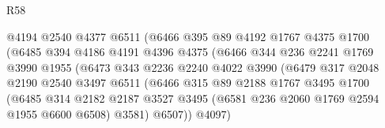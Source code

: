\begin{lexlean}{R58}
\begin{coremodule}
                                  @4194
                                  @2540
                                  @4377
                                  @6511
                                  (@6466
                                    @395
                                    @89
                                    @4192
                                    @1767
                                    @4375
                                    @1700
                                    (@6485
                                      @394
                                      @4186
                                      @4191
                                      @4396
                                      @4375
                                      (@6466
                                        @344
                                        @236
                                        @2241
                                        @1769
                                        @3990
                                        @1955
                                        (@6473
                                          @343
                                          @2236
                                          @2240
                                          @4022
                                          @3990
                                          (@6479
                                            @317
                                            @2048
                                            @2190
                                            @2540
                                            @3497
                                            @6511
                                            (@6466
                                              @315
                                              @89
                                              @2188
                                              @1767
                                              @3495
                                              @1700
                                              (@6485
                                                @314
                                                @2182
                                                @2187
                                                @3527
                                                @3495
                                                (@6581 @236 @2060 @1769 @2594 @1955 @6600 @6508)
                                                @3581)
                                              @6507))
                                          @4097)

\end{coremodule}
\end{lexlean}
